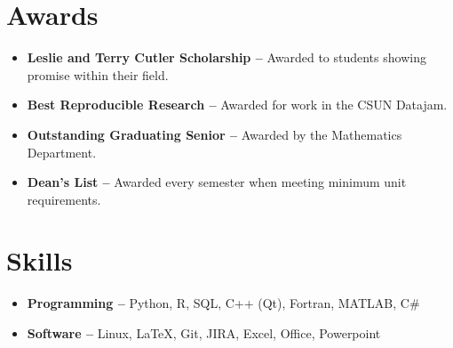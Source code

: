 \documentclass[letterpaper,11pt]{article}
\newcommand{\resumeItem}[1]{
  \item\small{
    {#1 \vspace{-2pt}}
  }
}
\newcommand{\resumeSubItem}[2]{\resumeItem{\textbf{#1 --}\hspace{-7pt}}{#2}\vspace{-4pt}}
\newcommand{\resumeSubHeadingListStart}{\begin{itemize}[leftmargin=*]}
\newcommand{\resumeSubHeadingListEnd}{\end{itemize}}
\begin{document}
\section{Awards}
  \resumeSubHeadingListStart
  	\resumeSubItem{Leslie and Terry Cutler Scholarship}{Awarded to students showing promise within their field.}
  	\resumeSubItem{Best Reproducible Research}{Awarded for work in the CSUN Datajam.}
    \resumeSubItem{Outstanding Graduating Senior}{Awarded by the Mathematics Department.}
    \resumeSubItem{Dean's List}
      {Awarded every semester when meeting minimum unit requirements.}  
  \resumeSubHeadingListEnd
  
\section{Skills}
  \resumeSubHeadingListStart
    \resumeSubItem{Programming}{Python, R, SQL, C++ (Qt), Fortran, MATLAB, C\#}
    \resumeSubItem{Software}{Linux, \LaTeX , Git, JIRA, Excel, Office, Powerpoint}
    
  \resumeSubHeadingListEnd
%


\end{document}

